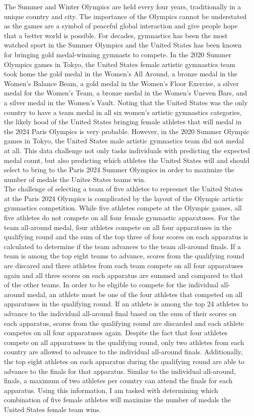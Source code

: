 \documentclass[12pt]{article}
\begin{document}
The Summer and Winter Olympics are held every four years, traditionally in a unique country and city.
The importance of the Olympics cannot be understated as the games are a symbol of peaceful global 
interaction and give people hope that a better world is possible. For decades, gymnastics  
has been the most watched sport in the Summer Olympics and the United States has been known for bringing gold 
medal-winning gymnasts to compete. In the 2020 Summer Olympics games in Tokyo, the United States 
female artistic gymnastics team took home the gold medal in the Women's All Around, a bronze medal 
in the Women's Balance Beam, a gold medal in the Women's Floor Exercise, a silver medal for the Women's
Team, a bronze medal in the Women's Uneven Bars, and a silver medal in the Women's Vault. 
Noting that the United States was the only country to have a team medal in all six women's artistic gymnastics 
categories, the likely hood of the United States bringing female athletes that will medal in the 2024 
Paris Olympics is very probable. However, in the 2020 Summer Olympic games in Tokyo, the United States 
male artistic gymnastics team did not medal at all. This data challenge not only tasks individuals 
with predicting the expected medal count, but also predicting which athletes the United States will 
and should select to bring to the Paris 2024 Summer Olympics in order to maximize the number of medals 
the Unites States teams win. 
\\
The challenge of selecting a team of five athletes to represnet the United States at the Paris 2024 Olympics is 
complicated by the layout of the Olympic artictic gymnastics competition. While five athletes compete at the 
Olympic games, all five athletes do not compete on all four female gymnastic apparatuses. For the team all-around 
medal, four athletes compete on all four apparatuses in the qualifying round and the sum of the top three of four scores 
on each apparatus is calculated to determine if the team advances to the team all-around finals. If a team 
is among the top eight teams to advance, scores from the qualifying round are discared and three athletes from each 
team compete on all four apparatuses again and all three scores on each apparatus are summed and compared to that 
of the other teams. In order to be eligible to compete for the individual all-around medal, an athlete must be 
one of the four athletes that competed on all apparatuses in the qualifying round. If an athlete is among the top 
24 athletes to advance to the individual all-around final based on the sum of their scores on each apparatus, 
scores from the qualifying round are discarded and each athlete competes on all four apparatuses again. Despite 
the fact that four athletes compete on all apparatuses in the qualifying round, only two athletes from each country 
are allowed to advance to the individual all-around finals. Additionally, the top eight athletes on each apparatus 
during the qualifying round are able to advance to the finals for that apparatus. Similar to the individual all-around, 
finals, a maximum of two athletes per country can attend the finals for each apparatus. Using this information, I am 
tasked with determining which combination of five female athletes will maximize the number of medals the United 
States female team wins.
\end{document}

